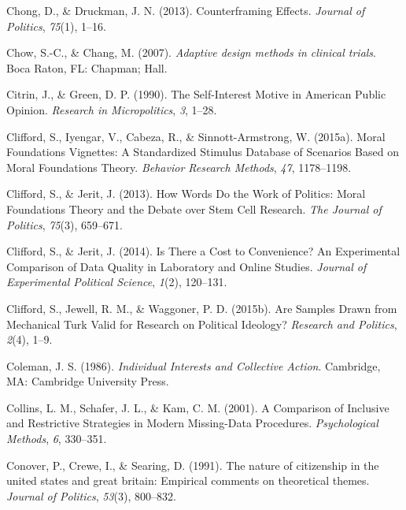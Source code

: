 \documentclass[12pt,econ]{sources/authesis}
\begin{document}
\leavevmode\hypertarget{ref-chong_counterframing_2013}{}%
Chong, D., \& Druckman, J. N. (2013). Counterframing Effects. \emph{Journal of Politics}, \emph{75}(1), 1--16.

\leavevmode\hypertarget{ref-chow_2007_adaptive}{}%
Chow, S.-C., \& Chang, M. (2007). \emph{Adaptive design methods in clinical trials}. Boca Raton, FL: Chapman; Hall.

\leavevmode\hypertarget{ref-citrin_1990_self-interest}{}%
Citrin, J., \& Green, D. P. (1990). The Self-Interest Motive in American Public Opinion. \emph{Research in Micropolitics}, \emph{3}, 1--28.

\leavevmode\hypertarget{ref-clifford_2015_moral}{}%
Clifford, S., Iyengar, V., Cabeza, R., \& Sinnott-Armstrong, W. (2015a). Moral Foundations Vignettes: A Standardized Stimulus Database of Scenarios Based on Moral Foundations Theory. \emph{Behavior Research Methods}, \emph{47}, 1178--1198.

\leavevmode\hypertarget{ref-clifford_2013_words}{}%
Clifford, S., \& Jerit, J. (2013). How Words Do the Work of Politics: Moral Foundations Theory and the Debate over Stem Cell Research. \emph{The Journal of Politics}, \emph{75}(3), 659--671.

\leavevmode\hypertarget{ref-clifford_2014_there}{}%
Clifford, S., \& Jerit, J. (2014). Is There a Cost to Convenience? An Experimental Comparison of Data Quality in Laboratory and Online Studies. \emph{Journal of Experimental Political Science}, \emph{1}(2), 120--131.

\leavevmode\hypertarget{ref-clifford_2015_samples}{}%
Clifford, S., Jewell, R. M., \& Waggoner, P. D. (2015b). Are Samples Drawn from Mechanical Turk Valid for Research on Political Ideology? \emph{Research and Politics}, \emph{2}(4), 1--9.

\leavevmode\hypertarget{ref-coleman_1986_individual}{}%
Coleman, J. S. (1986). \emph{Individual Interests and Collective Action}. Cambridge, MA: Cambridge University Press.

\leavevmode\hypertarget{ref-collins_2001_comparison}{}%
Collins, L. M., Schafer, J. L., \& Kam, C. M. (2001). A Comparison of Inclusive and Restrictive Strategies in Modern Missing-Data Procedures. \emph{Psychological Methods}, \emph{6}, 330--351.

\leavevmode\hypertarget{ref-conover_1991_nature}{}%
Conover, P., Crewe, I., \& Searing, D. (1991). The nature of citizenship in the united states and great britain: Empirical comments on theoretical themes. \emph{Journal of Politics}, \emph{53}(3), 800--832.
\end{document}
